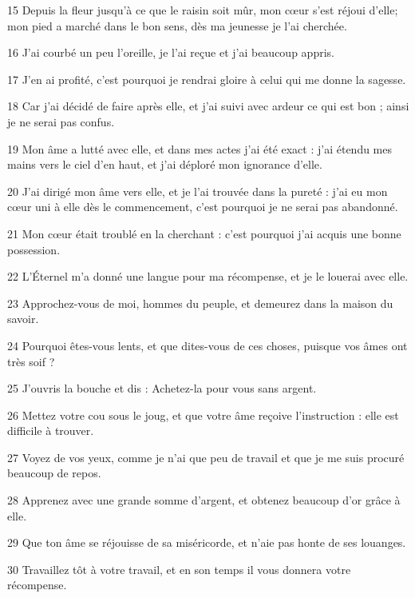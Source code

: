 \par 15 Depuis la fleur jusqu'à ce que le raisin soit mûr, mon cœur s'est réjoui d'elle; mon pied a marché dans le bon sens, dès ma jeunesse je l'ai cherchée.
\par 16 J'ai courbé un peu l'oreille, je l'ai reçue et j'ai beaucoup appris.
\par 17 J'en ai profité, c'est pourquoi je rendrai gloire à celui qui me donne la sagesse.
\par 18 Car j'ai décidé de faire après elle, et j'ai suivi avec ardeur ce qui est bon ; ainsi je ne serai pas confus.
\par 19 Mon âme a lutté avec elle, et dans mes actes j'ai été exact : j'ai étendu mes mains vers le ciel d'en haut, et j'ai déploré mon ignorance d'elle.
\par 20 J'ai dirigé mon âme vers elle, et je l'ai trouvée dans la pureté : j'ai eu mon cœur uni à elle dès le commencement, c'est pourquoi je ne serai pas abandonné.
\par 21 Mon cœur était troublé en la cherchant : c'est pourquoi j'ai acquis une bonne possession.
\par 22 L'Éternel m'a donné une langue pour ma récompense, et je le louerai avec elle.
\par 23 Approchez-vous de moi, hommes du peuple, et demeurez dans la maison du savoir.
\par 24 Pourquoi êtes-vous lents, et que dites-vous de ces choses, puisque vos âmes ont très soif ?
\par 25 J'ouvris la bouche et dis : Achetez-la pour vous sans argent.
\par 26 Mettez votre cou sous le joug, et que votre âme reçoive l'instruction : elle est difficile à trouver.
\par 27 Voyez de vos yeux, comme je n'ai que peu de travail et que je me suis procuré beaucoup de repos.
\par 28 Apprenez avec une grande somme d'argent, et obtenez beaucoup d'or grâce à elle.
\par 29 Que ton âme se réjouisse de sa miséricorde, et n'aie pas honte de ses louanges.
\par 30 Travaillez tôt à votre travail, et en son temps il vous donnera votre récompense.

